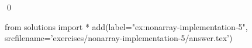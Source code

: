 
\begin{ex} 
  \label{ex:nonarray-implementation-5}
  
  \qed
\end{ex} 
\begin{python0}
from solutions import *
add(label="ex:nonarray-implementation-5",
    srcfilename='exercises/nonarray-implementation-5/answer.tex') 
\end{python0}
